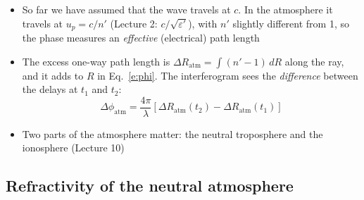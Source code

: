 \documentclass[11pt, oneside]{article}
\begin{document}
\begin{itemize}
	\item So far we have assumed that the wave travels at $c$. In the atmosphere it travels at $u_p = c/n'$ (Lecture 2: $c/\sqrt{\varepsilon'}$), with $n'$ slightly different from 1, so the phase measures an \emph{effective} (electrical) path length
	\item The excess one-way path length is $\Delta R_\mathrm{atm} = \int(n' - 1)\,dR$ along the ray, and it adds to $R$ in Eq.~\eqref{e:phi}. The interferogram sees the \emph{difference} between the delays at $t_1$ and $t_2$:
	\begin{equation}
		\label{e:datm}
		\Delta\phi_\mathrm{atm} = \frac{4\pi}{\lambda}\left[\Delta R_\mathrm{atm}(t_2) - \Delta R_\mathrm{atm}(t_1)\right]
	\end{equation}
	\item Two parts of the atmosphere matter: the neutral troposphere and the ionosphere (Lecture 10)
\end{itemize}

\subsection{Refractivity of the neutral atmosphere}
\end{document}

